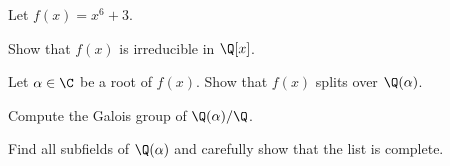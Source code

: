 Let $f(x)=x^6+3$.
\begin{alist}
\item Show that $f(x)$ is irreducible in $\Q[x]$.
\item Let $\alpha\in \C$ be a root of $f(x)$. Show that $f(x)$ splits
over $\Q(\alpha)$.
\item Compute the Galois group of $\Q(\alpha)/\Q$.
\item Find all subfields of $\Q(\alpha)$ and carefully show that the
list is complete.
\end{alist}
